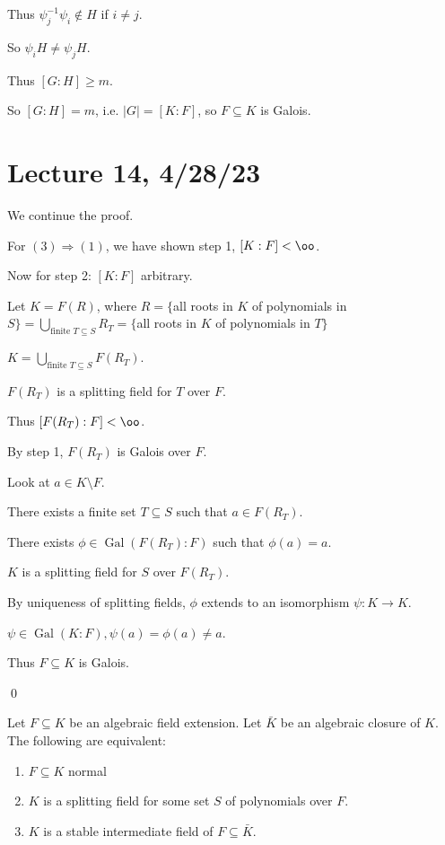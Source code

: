 \documentclass[x11names,reqno,14pt]{extarticle}
\DeclareMathOperator{\Gal}{Gal}
\begin{document}
Thus $\psi_j^{-1}\psi_i \not\in H$ if $i \neq j$. 

So $\psi_iH \neq \psi_jH$. 

Thus $[G:H]\geq m$. 

So $[G:H] = m$, i.e. $|G| = [K:F]$, so $F \subseteq K$ is Galois. 

\section*{Lecture 14, 4/28/23}

We continue the proof. 

For $(3)\Rightarrow(1)$, we have shown step 1, $[K:F]<\oo$. 

Now for step 2: $[K:F]$ arbitrary. 

Let $K = F(R)$, where $R = \{$all roots in $K$ of polynomials in $S\} = \bigcup_{\text{finite }T \subseteq S} R_T = \{$all roots in $K$ of polynomials in $T\}$

$K = \bigcup_{\text{finite }T\subseteq S}F(R_T)$. 

$F(R_T)$ is a splitting field for $T$ over $F$. 

Thus $[F(R_T): F]<\oo$. 

By step 1, $F(R_T)$ is Galois over $F$. 

Look at $a \in K \setminus F$. 

There exists a finite set $T \subseteq S$ such that $a \in F(R_T)$. 

There exists $\phi \in \Gal(F(R_T):F)$ such that $\phi(a) = a$. 

$K$ is a splitting field for $S$ over $F(R_T)$. 

By uniqueness of splitting fields, $\phi$ extends to an isomorphism $\psi:K\to K$. 

$\psi\in\Gal(K:F), \psi(a) = \phi(a) \neq a$. 

Thus $F\subseteq K$ is Galois. 

\qed

\thm

Let $F \subseteq K$ be an algebraic field extension. Let $\bar{K}$ be an algebraic closure of $K$. The following are equivalent:

\begin{enumerate}

\item $F \subseteq K$ normal

\item $K$ is a splitting field for some set $S$ of polynomials over $F$. 

\item $K$ is a stable intermediate field of $F \subseteq \bar{K}$. 

\end{enumerate}
\end{document}
